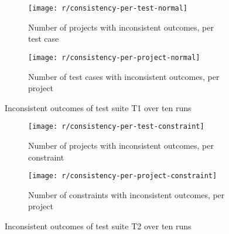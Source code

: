\begin{figure}[htpb]
    \centering
    \begin{subfigure}{.75\textwidth}
        \texttt{[image: r/consistency-per-test-normal]}%
        \vspace{-\medskipamount}
        \caption{Number of projects with inconsistent outcomes, per test case}
        \label{fig:consistency_per_test_normal}
    \end{subfigure}

    \bigskip

    \begin{subfigure}{.75\textwidth}
        \texttt{[image: r/consistency-per-project-normal]}%
        \vspace{-\medskipamount}
        \caption{Number of test cases with inconsistent outcomes, per project}
        \label{fig:consistency_per_project_normal}
    \end{subfigure}

    \caption{Inconsistent outcomes of test suite T1 over ten runs}
    \label{fig:consistency_normal}
\end{figure}

\begin{figure}[htpb]
    \centering
    \begin{subfigure}{.75\textwidth}
        \texttt{[image: r/consistency-per-test-constraint]}%
        \vspace{-\medskipamount}
        \caption{Number of projects with inconsistent outcomes, per constraint}
        \label{fig:consistency_per_test_constraint}
    \end{subfigure}

    \bigskip

    \begin{subfigure}{.75\textwidth}
        \texttt{[image: r/consistency-per-project-constraint]}%
        \vspace{-\medskipamount}
        \caption{Number of constraints with inconsistent outcomes, per project}
        \label{fig:consistency_per_project_constraint}
    \end{subfigure}

    \caption{Inconsistent outcomes of test suite T2 over ten runs}
    \label{fig:consistency_constraint}
\end{figure}

